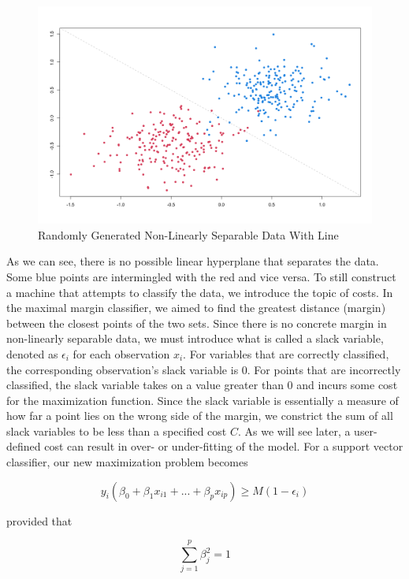 \documentclass[12pt]{article}
\begin{document}
\begin{figure}
    \centering
    \includegraphics[width=5in]{Figures/svc_randomly_generated_w_line.png}
    \caption{Randomly Generated Non-Linearly Separable Data With Line}
    \label{fig_svc_randomly_generated_w_line}
\end{figure}

As we can see, there is no possible linear hyperplane that separates the data. Some blue points are intermingled with the red and vice versa. To still construct a machine that attempts to classify the data, we introduce the topic of costs. In the maximal margin classifier, we aimed to find the greatest distance (margin) between the closest points of the two sets. Since there is no concrete margin in non-linearly separable data, we must introduce what is called a slack variable, denoted as $\epsilon_i$ for each observation $x_i$. For variables that are correctly classified, the corresponding observation's slack variable is 0. For points that are incorrectly classified, the slack variable takes on a value greater than 0 and incurs some cost for the maximization function. Since the slack variable is essentially a measure of how far a point lies on the wrong side of the margin, we constrict the sum of all slack variables to be less than a specified cost $C$. As we will see later, a user-defined cost can result in over- or under-fitting of the model. For a support vector classifier, our new maximization problem becomes

\[
y_i(\beta_0+\beta_1x_{i1}+...+\beta_px_{ip}) \ge M(1-\epsilon_i)
\]

provided that

\begin{equation}\label{sum_of_squares}
\sum_{j=1}^{p} \beta^2_j=1
\end{equation}
\end{document}

